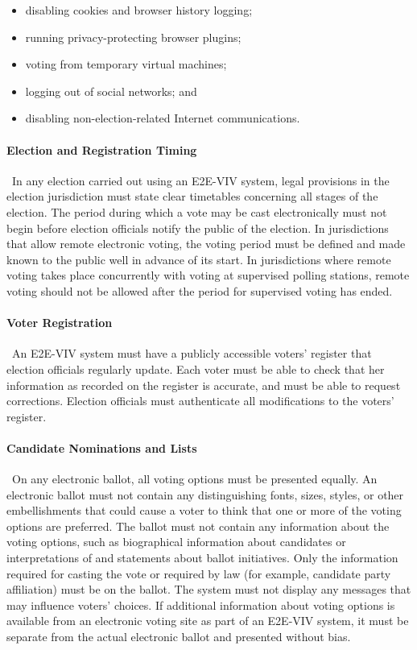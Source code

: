\begin{itemize}
\item disabling cookies and browser history logging;
\item running privacy-protecting browser plugins;
\item  voting from temporary virtual machines;
\item  logging out of social networks; and
\item disabling non-election-related Internet communications.
\end{itemize}

\paragraph{Election and Registration Timing} \ In any election carried
out using an E2E-VIV system, legal provisions in the election
jurisdiction must state clear timetables concerning all stages of the
election. The period during which a vote may be cast electronically
must not begin before election officials notify the public of the
election. In jurisdictions that allow remote electronic voting, the
voting period must be defined and made known to the public well in
advance of its start. In jurisdictions where remote voting takes place
concurrently with voting at supervised polling stations, remote voting
should not be allowed after the period for supervised voting has
ended.

\paragraph{Voter Registration} \ An E2E-VIV system must have a
publicly accessible voters' register that election officials regularly
update. Each voter must be able to check that her information as
recorded on the register is accurate, and must be able to request
corrections. Election officials must authenticate all modifications to
the voters' register.

\paragraph{Candidate Nominations and Lists} \ On any electronic
ballot, all voting options must be presented equally. An electronic
ballot must not contain any distinguishing fonts, sizes, styles, or
other embellishments that could cause a voter to think that one or
more of the voting options are preferred. The ballot must not contain
any information about the voting options, such as biographical
information about candidates or interpretations of and statements
about ballot initiatives. Only the information required for casting
the vote or required by law (for example, candidate party affiliation)
must be on the ballot. The system must not display any messages that
may influence voters' choices. If additional information about voting
options is available from an electronic voting site as part of an
E2E-VIV system, it must be separate from the actual electronic ballot
and presented without bias.

